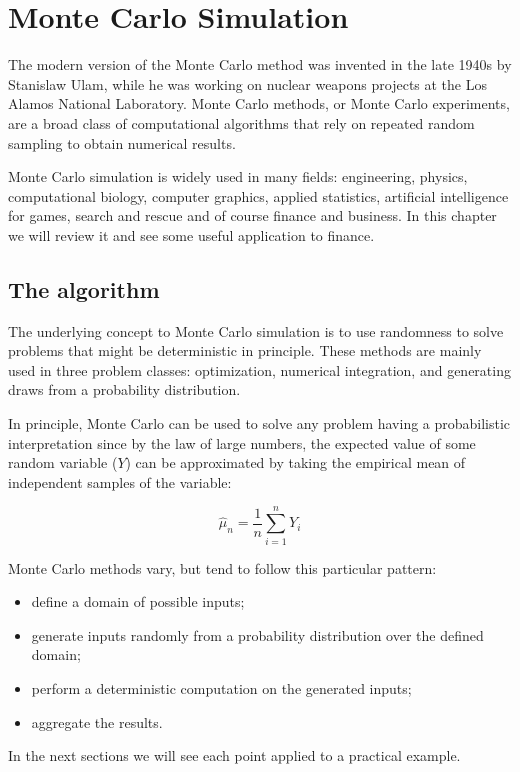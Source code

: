 \chapter{Monte Carlo Simulation}    

The modern version of the Monte Carlo method was invented in the late
1940s by Stanislaw Ulam, while he was working on nuclear weapons
projects at the Los Alamos National Laboratory.
Monte Carlo methods, or Monte Carlo experiments, are a broad class of
computational algorithms that rely on repeated random sampling to obtain
numerical results. 

Monte Carlo simulation is widely used in many fields: engineering,
physics, computational biology, computer graphics, applied statistics,
artificial intelligence for games, search and rescue and of course
finance and business.
In this chapter we will review it and see some useful application to finance.

\section{The algorithm}\label{whats-monte-carlo-simulation}

The underlying concept to Monte Carlo simulation is to use randomness to solve
problems that might be deterministic in principle. These methods
are mainly used in three problem classes: optimization, numerical
integration, and generating draws from a probability distribution.

In principle, Monte Carlo can be used to solve any problem
having a probabilistic interpretation since by the law of large numbers, the
expected value of some random variable ($Y$) can be approximated by taking the
empirical mean of independent samples of the variable:

\[ \hat{\mu}_n = \frac{1}{n}\sum_{i=1}^{n}{Y_i} \]

Monte Carlo methods vary, but tend to follow this particular pattern:
\begin{itemize}
\tightlist
\item
  define a domain of possible inputs;
\item
  generate inputs randomly from a probability distribution over the
  defined domain;
\item
  perform a deterministic computation on the generated inputs;
\item
  aggregate the results.
\end{itemize}
In the next sections we will see each point applied to a practical example.

